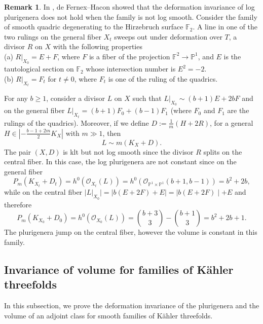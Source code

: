 \documentclass[12pt]{amsart}
\numberwithin{equation}{section}
\theoremstyle{definition}
\theoremstyle{plain}
\newtheorem*{thm A*}{Theorem A}
\newtheorem*{thm B*}{Theorem B}
\newtheorem*{thm C*}{Theorem C}
\newtheorem*{thm D*}{Theorem D}
\theoremstyle{definition}
\newtheorem{remark}  [theorem]     {Remark}
\renewcommand{\1}{\mathds{1}}
\renewcommand{\>}{\rightarrow}
\begin{document}
\begin{remark}
In \cite[Remark 4.10]{FH11}, de Fernex--Hacon showed that the deformation invariance of log plurigenera does not hold when the family is not log smooth. Consider the family of smooth quadric degenerating to the Hirzebruch surface $\mathbb{F}_2$. A line in one of the two rulings on the general fiber $X_t$ sweeps out under deformation over $T$, a divisor $R$ on $X$ with the following properties\\
(a) $\left.R\right|_{X_0}=E+F$, where $F$ is a fiber of the projection $\mathbb{F}^2 \rightarrow \mathbb{P}^1$, and $E$ is the tautological section on $\mathbb{F}_2$ whose intersection number is $E^2 = -2$. \\
(b) $R|_{X_t} = F_t$ for $t
 \ne 0$, where $F_t$ is one of the ruling of the quadrics.

For any $b \ge 1$, consider a divisor $L$ on $X$ such that $\left.L\right|_{X_0} \sim(b+1) E+2 b F$ and on the general fiber $L|_{X_t} = (b+1)F_0 + (b-1)F_1$ (where $F_0$ and $F_1$ are the rulings of the quadrics). Moreover, if we define $D:=\frac{1}{m}(H+2 R)$, for a general $H \in\left|-\frac{b-1+2 m}{2} K_X\right|$ with $m\gg 1$, then $$L \sim m\left(K_X+D\right).$$
The pair $(X,D)$ is klt but not log smooth since the divisor $R$ splits on the central fiber. In this case, the log plurigenera are not constant since on the general fiber $$ P_m (K_{X_t}+D_t)=h^0\left(\mathcal{O}_{X_t}(L)\right)=h^0\left(\mathcal{O}_{\mathbb{P}^1 \times \mathbb{P}^1}(b+1, b-1)\right)=b^2+2 b,$$while on the central fiber $|L|_{X_0}|=| b(E+2 F)+E|=| b(E+2 F) \mid+E$ and therefore $$P_m (K_{X_0} + D_0) = h^0\left(\mathcal{O}_{X_0}(L)\right)=\binom{b+3}{3}-\binom{b+1}{3}=b^2+2 b+1.$$The plurigenera jump on the central fiber, however the volume is constant in this family.
\end{remark}

\subsection{Invariance of volume for families of K\"ahler threefolds}
In this subsection, we prove the deformation invariance of the plurigenera and the volume of an adjoint class for smooth families of K\"ahler threefolds.
\end{document}
